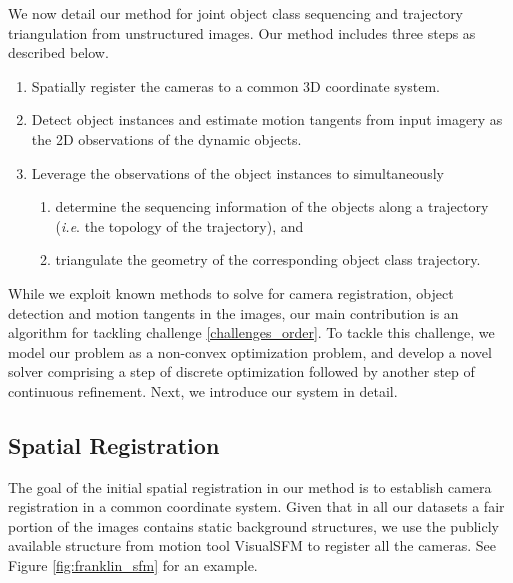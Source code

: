 We now detail our method for joint object class sequencing and trajectory triangulation from unstructured images. 
Our method includes three steps as described below.
\begin{enumerate}
\item \label{challenges_sfm} Spatially register the cameras to a common 3D coordinate system.
\item \label{challenges_tang} Detect object instances and estimate motion tangents from input imagery as the 2D observations of the dynamic objects.
\item \label{challenges_order} Leverage the observations of the object instances to simultaneously
\begin{enumerate}
\item determine the sequencing information of the objects along a trajectory (\emph{i.e}. the topology of the trajectory), and
\item triangulate the geometry of the corresponding object class trajectory.
\end{enumerate}

\end{enumerate}
While we exploit known methods to solve for camera registration, object detection and motion tangents in the images, our main contribution is an algorithm for tackling challenge  \ref{challenges_order}. To tackle this challenge, we model our problem as a non-convex optimization problem, and develop a novel solver comprising a step of discrete optimization followed by another step of continuous refinement. 
Next, we introduce our system in detail.

\subsection{Spatial Registration}
The goal of the initial spatial registration in our method is to establish camera registration in a common coordinate system.
Given that in all our datasets a fair portion of the images contains static background structures, we use the publicly available structure from motion tool VisualSFM  \cite{WuVSFM} to register all the cameras. See Figure \ref{fig:franklin_sfm} for an example.

